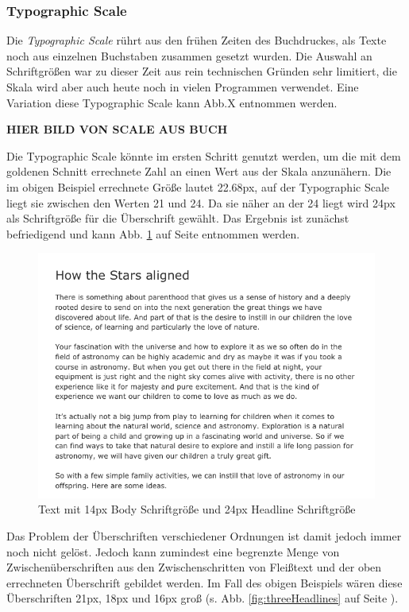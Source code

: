 \subsubsection{Typographic Scale}
Die \textit{Typographic Scale} rührt aus den frühen Zeiten des Buchdruckes, als Texte noch aus einzelnen Buchstaben zusammen gesetzt wurden. Die Auswahl an Schriftgrößen war zu dieser Zeit aus rein technischen Gründen sehr limitiert, die Skala wird aber auch heute noch in vielen Programmen verwendet. Eine Variation diese Typographic Scale kann Abb.X entnommen werden.

\textbf{HIER BILD VON SCALE AUS BUCH}

Die Typographic Scale könnte im ersten Schritt genutzt werden, um die mit dem goldenen Schnitt errechnete Zahl an einen Wert aus der Skala anzunähern.
Die im obigen Beispiel errechnete Größe lautet 22.68px, auf der Typographic Scale liegt sie zwischen den Werten 21 und 24. Da sie näher an der 24 liegt wird 24px als Schriftgröße für die Überschrift gewählt. Das Ergebnis ist zunächst befriedigend und kann Abb. \ref{fig:basicHeadline} auf Seite \pageref{fig:basicHeadline} entnommen werden.

\begin{figure}[h]
    \centering
    \includegraphics[width=1\textwidth]{images/Proof-Golden-Ratio.png}
    \caption{Text mit 14px Body Schriftgröße und 24px Headline Schriftgröße}
    \label{fig:basicHeadline}
\end{figure}

Das Problem der Überschriften verschiedener Ordnungen ist damit jedoch immer noch nicht gelöst. Jedoch kann zumindest eine begrenzte Menge von Zwischenüberschriften aus den Zwischenschritten von Fleißtext und der oben errechneten Überschrift gebildet werden. Im Fall des obigen Beispiels wären diese Überschriften 21px, 18px und 16px groß (s. Abb. \ref{fig:threeHeadlines} auf Seite \pageref{fig:threeHeadlines}).

